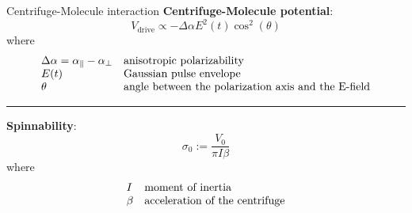 \begin{frame}{Centrifuge-Molecule interaction}
  \textbf{Centrifuge-Molecule potential}:
  \[
  \boxed{
    V_{\mathrm{drive}} \propto
    -\Delta\alpha E^2(t)\cos^2(\theta)
  }
\]
  where
\[
\begin{array}{@{}ll@{}}
  \Delta \alpha = \alpha_{\parallel}-\alpha_{\perp}
    & \text{anisotropic polarizability} \\
  E(t)
    & \text{Gaussian pulse envelope} \\
  \theta
    & \text{angle between the polarization axis and the E-field}
\end{array}
\]
\vspace{0.05cm}
\noindent\rule{\linewidth}{0.5pt}
\vspace{0.05cm}
\textbf{Spinnability}:
\[
  \boxed{
    \sigma_0 := \frac{V_0}{\pi I \beta}
  }
\]
where
\[
\begin{array}{@{}ll@{}}
  I
    & \text{moment of inertia} \\
  \beta
    & \text{acceleration of the centrifuge}
\end{array}
\]
\end{frame}